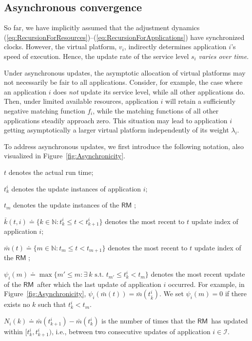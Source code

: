 \documentclass[letter,11pt]{article}
\begin{document}
\subsection{Asynchronous convergence}		\label{sec:AsynchronousConvergence}

So far, we have implicitly assumed that the adjustment dynamics (\ref{eq:RecursionForResources})--(\ref{eq:RecursionForApplications}) have synchronized clocks. However, the virtual platform, $v_i$, indirectly determines application $i$'s speed of execution. Hence, the update rate of the service level $s_i$ \emph{varies over time}.

Under asynchronous updates, the asymptotic allocation of virtual platforms may not necessarily be fair to all applications. Consider, for example, the case where an application $i$ does \textit{not} update its service level, while all other applications do. Then, under limited available resources, application $i$ will retain a
sufficiently negative matching function $f_i$, while the matching functions of all other applications steadily approach zero. This situation may lead to application $i$ getting asymptotically a larger virtual platform independently of its weight $\lambda_i$.

To address asynchronous updates, we first introduce the following notation, also visualized in
Figure~\ref{fig:Asynchronicity}.
\begin{itemize}
{\item[$\bullet$]} $t$ denotes the actual run time;
{\item[$\bullet$]} $t_k^i$ denotes the update instances of application $i$;
{\item[$\bullet$]} $t_m$ denotes the update instances of the {$\mathsf{RM}$} ;
{\item[$\bullet$]} $\bar{k}(t,i) {\doteq} \{k\in\mathbb{N}: t_k^i\leq t < t_{k+1}^i\}$ denotes the most recent to $t$ update index of application $i$;
{\item[$\bullet$]} $\bar{m}(t) {\doteq} \{m\in\mathbb{N}: t_m\leq{t} < t_{m+1}\}$ denotes the most recent to $t$ update index of the {$\mathsf{RM}$} ;
  
  
{\item[$\bullet$]} $\psi_i(m) {\doteq} \max\{m'\leq{m}: \exists ~ k \mbox{ s.t. } t_{m'}\leq{t_k^i}<t_{m}\}$ denotes the most recent update of the {$\mathsf{RM}$}\ after which the last update of application $i$ occurred. For example, in Figure~\ref{fig:Asynchronicity}, $\psi_i(\bar{m}(t)) = \bar{m}(t_{\bar{k}}^{i})$. We set $\psi_i(m)=0$ if there exists no ${k}$ such that $t_k^i<t_m$.  
{\item[$\bullet$]} $N_i(k) {\doteq} \bar{m}(t_{k+1}^i)-\bar{m}(t_k^i)$ is the number of times that the {$\mathsf{RM}$}\ has updated within $[t^i_k,t^i_{k+1})$, i.e., between two consecutive updates of application $i\in\mathcal{I}$.
\end{itemize}
\end{document}
